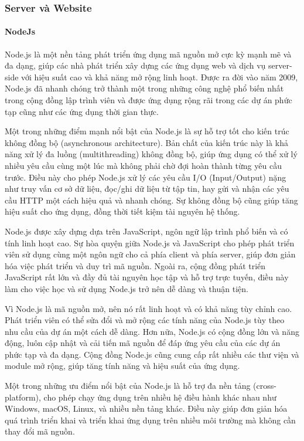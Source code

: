 \subsubsection{Server và Website}

\paragraph{NodeJs}
\mbox{}

Node.js là một nền tảng phát triển ứng dụng mã nguồn mở cực kỳ mạnh mẽ và đa dạng, giúp các nhà phát triển xây dựng các ứng dụng web và dịch vụ server-side với hiệu suất cao và khả năng mở rộng linh hoạt. Được ra đời vào năm 2009, Node.js đã nhanh chóng trở thành một trong những công nghệ phổ biến nhất trong cộng đồng lập trình viên và được ứng dụng rộng rãi trong các dự án phức tạp cũng như các ứng dụng thời gian thực.

Một trong những điểm mạnh nổi bật của Node.js là sự hỗ trợ tốt cho kiến trúc không đồng bộ (asynchronous architecture). Bản chất của kiến trúc này là khả năng xử lý đa luồng (multithreading) không đồng bộ, giúp ứng dụng có thể xử lý nhiều yêu cầu cùng một lúc mà không phải chờ đợi hoàn thành từng yêu cầu trước. Điều này cho phép Node.js xử lý các yêu cầu I/O (Input/Output) nặng như truy vấn cơ sở dữ liệu, đọc/ghi dữ liệu từ tập tin, hay gửi và nhận các yêu cầu HTTP một cách hiệu quả và nhanh chóng. Sự không đồng bộ cũng giúp tăng hiệu suất cho ứng dụng, đồng thời tiết kiệm tài nguyên hệ thống.

Node.js được xây dựng dựa trên JavaScript, ngôn ngữ lập trình phổ biến và có tính linh hoạt cao. Sự hòa quyện giữa Node.js và JavaScript cho phép phát triển viên sử dụng cùng một ngôn ngữ cho cả phía client và phía server, giúp đơn giản hóa việc phát triển và duy trì mã nguồn. Ngoài ra, cộng đồng phát triển JavaScript rất lớn và đầy đủ tài nguyên học tập và hỗ trợ trực tuyến, điều này làm cho việc học và sử dụng Node.js trở nên dễ dàng và thuận tiện.

Vì Node.js là mã nguồn mở, nên nó rất linh hoạt và có khả năng tùy chỉnh cao. Phát triển viên có thể sửa đổi và mở rộng các tính năng của Node.js tùy theo nhu cầu của dự án một cách dễ dàng. Hơn nữa, Node.js có cộng đồng lớn và năng động, luôn cập nhật và cải tiến mã nguồn để đáp ứng yêu cầu của các dự án phức tạp và đa dạng. Cộng đồng Node.js cũng cung cấp rất nhiều các thư viện và module mở rộng, giúp tăng tính năng và hiệu suất của ứng dụng.

Một trong những ưu điểm nổi bật của Node.js là hỗ trợ đa nền tảng (cross-platform), cho phép chạy ứng dụng trên nhiều hệ điều hành khác nhau như Windows, macOS, Linux, và nhiều nền tảng khác. Điều này giúp đơn giản hóa quá trình triển khai và triển khai ứng dụng trên nhiều môi trường mà không cần thay đổi mã nguồn.

